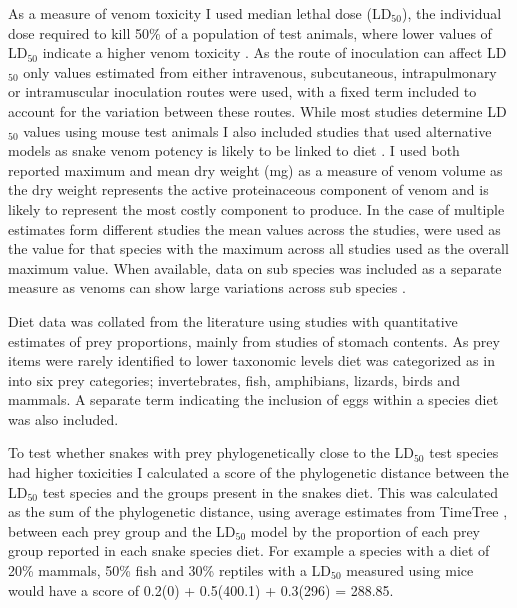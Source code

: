 As a measure of venom toxicity I used median lethal dose (LD$_{50}$), the individual dose required to kill 50\% of a population of test animals, where lower values of LD$_{50}$ indicate a higher venom toxicity \citep{chippaux1991snake}. As the route of inoculation can affect LD$_{50}$ \citep{chippaux1991snake} only values estimated from either intravenous, subcutaneous, intrapulmonary or intramuscular inoculation routes were used, with a fixed term included to account for the variation between these routes. While most studies determine LD$_{50}$ values using mouse test animals I also included studies that used alternative models as snake venom potency is likely to be linked to diet \citep{barlow2009coevolution}. I used both reported maximum and mean dry weight (mg) as a measure of venom volume as the dry weight represents the active proteinaceous component of venom and is likely to represent the most costly component to produce. In the case of multiple estimates form different studies the mean values across the studies, were used as the value for that species with the maximum across all studies used as the overall maximum value. When available, data on sub species was included as a separate measure as venoms can show large variations across sub species \citep{chippaux1991snake}.


Diet data was collated from the literature using studies with quantitative estimates of prey proportions, mainly from studies of stomach contents. As prey items were rarely identified to lower taxonomic levels diet was categorized as in \cite{allen2013evolution} into six prey categories; invertebrates, fish, amphibians, lizards, birds and mammals. A separate term indicating the inclusion of eggs within a species diet was also included.


To test whether snakes with prey phylogenetically close to the LD$_{50}$ test species had higher toxicities I calculated a score of the phylogenetic distance between the LD$_{50}$ test species and the groups present in the snakes diet. This was calculated as the sum of the phylogenetic distance, using average estimates from TimeTree \citep{hedges2006timetree}, between each prey group and the LD$_{50}$ model by the proportion of each prey group reported in each snake species diet. For example a species with a diet of 20\% mammals, 50\% fish and 30\% reptiles with a LD$_{50}$ measured using mice would have a score of 0.2\*(0) + 0.5\*(400.1) + 0.3\*(296) = 288.85.


